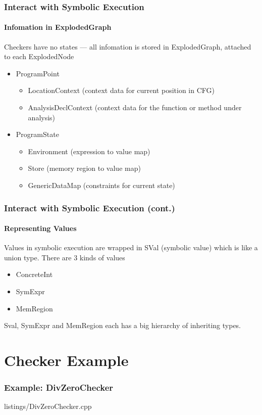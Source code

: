 \documentclass[]{beamer}
\begin{document}
\begin{frame}
  \frametitle{Interact with Symbolic Execution}
  \framesubtitle{Infomation in ExplodedGraph}
  Checkers have no states --- all infomation is stored
  in \alert{ExplodedGraph}, attached to each \alert{ExplodedNode}
  \pause
  \begin{itemize}
    \item \alert{ProgramPoint}
      \begin{itemize}
        \item LocationContext (context data for current position in CFG)
        \item AnalysisDeclContext (context data for the function
          or method under analysis)
      \end{itemize}
    \item \alert{ProgramState}
      \begin{itemize}
        \item \alert{Environment} (expression to value map)
        \item Store (memory region to value map)
        \item GenericDataMap (constraints for current state)
      \end{itemize}
  \end{itemize}
\end{frame}

\begin{frame}
  \frametitle{Interact with Symbolic Execution (cont.)}
  \framesubtitle{Representing Values}
  Values in symbolic execution are wrapped in \alert{SVal} (symbolic
  value) which is like a union type. There are 3 kinds of values
  \pause
  \begin{itemize}
    \item ConcreteInt
    \item SymExpr
    \item MemRegion
  \end{itemize}

  \pause
  \alert{Sval}, \alert{SymExpr} and \alert{MemRegion} each has
  a big hierarchy of inheriting types.
\end{frame}

\section{Checker Example}
\frame{\tableofcontents[currentsection]}

\begin{frame}
  \frametitle{Example: DivZeroChecker}
  
                  {listings/DivZeroChecker.cpp}
\end{frame}
\end{document}

